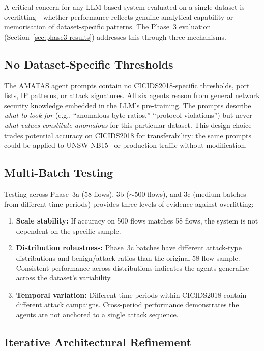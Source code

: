 \documentclass[12pt, a4paper, oneside]{report}
\begin{document}
A critical concern for any LLM-based system evaluated on a single dataset is
overfitting---whether performance reflects genuine analytical capability or
memorisation of dataset-specific patterns. The Phase~3 evaluation
(Section~\ref{sec:phase3-results}) addresses this through three mechanisms.

\subsection{No Dataset-Specific Thresholds}

The AMATAS agent prompts contain no CICIDS2018-specific thresholds, port lists,
IP patterns, or attack signatures. All six agents reason from general network
security knowledge embedded in the LLM's pre-training. The prompts describe
\emph{what to look for} (e.g., ``anomalous byte ratios,'' ``protocol violations'')
but never \emph{what values constitute anomalous} for this particular dataset. This
design choice trades potential accuracy on CICIDS2018 for transferability: the same
prompts could be applied to UNSW-NB15~\cite{moustafa2015unswnb15} or production
traffic without modification.

\subsection{Multi-Batch Testing}

Testing across Phase~3a (58 flows), 3b ($\sim$500 flows), and 3c (medium batches
from different time periods) provides three levels of evidence against overfitting:

\begin{enumerate}
  \item \textbf{Scale stability:} If accuracy on 500 flows matches 58 flows, the
        system is not dependent on the specific sample.
  \item \textbf{Distribution robustness:} Phase~3c batches have different
        attack-type distributions and benign/attack ratios than the original
        58-flow sample. Consistent performance across distributions indicates
        the agents generalise across the dataset's variability.
  \item \textbf{Temporal variation:} Different time periods within CICIDS2018
        contain different attack campaigns. Cross-period performance demonstrates
        the agents are not anchored to a single attack sequence.
\end{enumerate}

\subsection{Iterative Architectural Refinement}
\end{document}
